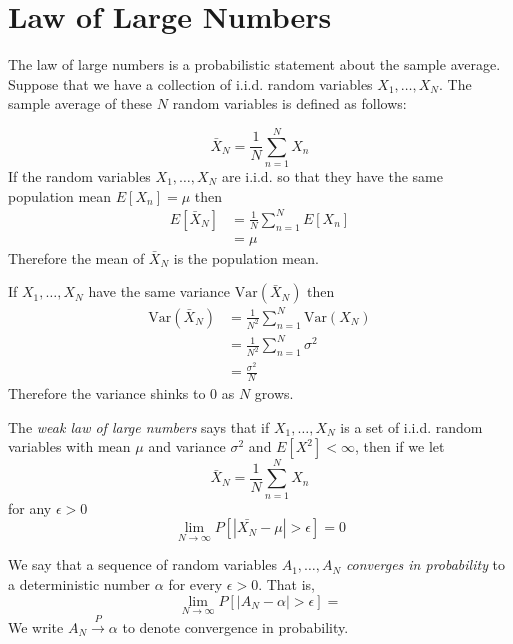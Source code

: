\section{Law of Large Numbers}
The law of large numbers is a
probabilistic statement about
the sample average. Suppose that
we have a collection of i.i.d.
random variables $X_1, \dots, X_N$.
The sample average of these $N$
random variables is defined as
follows:

\begin{equation}
    \bar{X}_N = \frac{1}{N}\sum_{n=1}^{N}X_n
\end{equation}
If the random variables $X_1, \dots, X_N$
are i.i.d. so that they have the same
population mean $E[X_n] = \mu$ then
\begin{align}
    E\left[\bar{X}_N\right] & = \frac{1}{N} \sum_{n=1}^{N} E\left[X_n\right] \\
                            & = \mu
\end{align}
Therefore the mean of $\bar{X}_N$ is the population
mean.

If $X_1, \dots, X_N$ have the
same variance $\text{Var}(\bar{X}_N)$
then
\begin{align}
    \text{Var}(\bar{X}_N) & = \frac{1}{N^2} \sum_{n=1}^{N} \text{Var}(X_N) \\
                          & = \frac{1}{N^2} \sum_{n=1}^{N} \sigma^2        \\
                          & = \frac{\sigma^2}{N}
\end{align}
Therefore the variance shinks to 0 as $N$ grows.

The \emph{weak law of large numbers} says that if
$X_1, \dots, X_N$ is a set of i.i.d. random
variables with mean $\mu$ and variance $\sigma^2$
and $E\left[X^2\right] < \infty$, then if we let
\begin{equation}
    \bar{X}_N = \frac{1}{N} \sum_{n=1}^{N} X_n
\end{equation}
for any $\epsilon > 0$
\begin{equation}
    \lim_{N\rightarrow \infty} P\left[|\bar{X_N} - \mu| > \epsilon\right] = 0
\end{equation}

We say that a sequence of random variables
$A_1, \dots, A_N$ \emph{converges in probability}
to a deterministic number $\alpha$ for every
$\epsilon > 0$. That is,
\begin{equation}
    \lim_{N\rightarrow \infty} P\left[|A_N - \alpha| > \epsilon\right] =
\end{equation}
We write $A_N \overset{P}{\rightarrow} \alpha$ to
denote convergence in probability.